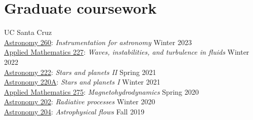\documentclass[12pt]{article}
\begin{document}



\else\fi









\ifdefined\withcourses{}
\section*{Graduate coursework}

UC Santa Cruz\\
\href{https://catalog.ucsc.edu/Current/General-Catalog/Courses/ASTR-Astronomy-and-Astrophysics/200/ASTR-260}{Astronomy 260}: \textit{Instrumentation for astronomy} \hfill Winter 2023\\
\href{https://catalog.ucsc.edu/en/Current/General-Catalog/Courses/AM-Applied-Mathematics/Graduate/AM-227}{Applied Mathematics 227}: \textit{Waves, instabilities, and turbulence in fluids} \hfill Winter 2022\\
\href{https://catalog.ucsc.edu/Current/General-Catalog/Courses/ASTR-Astronomy-and-Astrophysics/200/ASTR-222}{Astronomy 222}: \textit{Stars and planets II} \hfill Spring 2021\\
\href{https://catalog.ucsc.edu/Current/General-Catalog/Courses/ASTR-Astronomy-and-Astrophysics/200/ASTR-220A}{Astronomy 220A}: \textit{Stars and planets I} \hfill Winter 2021\\
\href{https://catalog.ucsc.edu/en/Current/General-Catalog/Courses/AM-Applied-Mathematics/Graduate/AM-275}{Applied Mathematics 275}: \textit{Magnetohydrodynamics} \hfill Spring 2020\\
\href{https://catalog.ucsc.edu/en/Current/General-Catalog/Courses/ASTR-Astronomy-and-Astrophysics/200/ASTR-202}{Astronomy 202}: \textit{Radiative processes} \hfill Winter 2020\\
\href{https://catalog.ucsc.edu/en/Current/General-Catalog/Courses/ASTR-Astronomy-and-Astrophysics/200/ASTR-204}{Astronomy 204}: \textit{Astrophysical flows} \hfill Fall 2019
\end{document}
